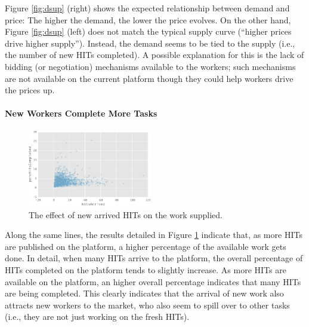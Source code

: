 Figure \ref{fig:dsup} (right) shows the expected relationship between demand and price: The higher the demand, the lower the price evolves. On the other hand, Figure \ref{fig:dsup} (left)  does not match the typical supply curve (``higher prices drive higher supply''). Instead, the demand seems to be tied to the supply (i.e., the number of new HITs completed). A possible explanation for this is the lack of bidding (or negotiation) mechanisms available to the workers; such mechanisms are not available on the current platform though they could help workers drive the prices up. 

\paragraph{New Workers Complete More Tasks}
\begin{figure}[tb]
	\centering
		\includegraphics[width=0.48\textwidth]{figures/percHitsCompleted}
	\caption{The effect of new arrived HITs on the work  supplied.}
	\label{fig:perc_hits_completed}
\end{figure}
Along the same lines, the results detailed in Figure \ref{fig:perc_hits_completed} indicate that, as more HITs are published on the platform, a higher percentage of the available work gets done. In detail, when many HITs arrive to the platform, the overall percentage of HITs completed on the platform tends to slightly increase. As more HITs are available on the platform, an higher overall percentage indicates that many HITs are being completed.
This clearly indicates that the arrival of new work also attracts new workers
to the market, who also seem to spill over to other tasks (i.e., they are not just working on the fresh HITs).

